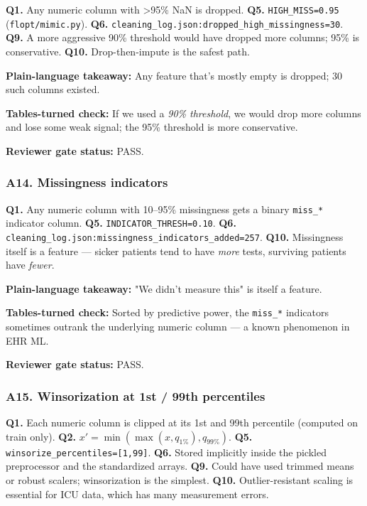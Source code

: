 \documentclass{article}
\begin{document}
\textbf{Q1.} Any numeric column with >95\% NaN is dropped. \textbf{Q5.} \texttt{HIGH\_MISS=0.95} (\texttt{flopt/mimic.py}). \textbf{Q6.} \texttt{cleaning\_log.json:dropped\_high\_missingness=30}. \textbf{Q9.} A more aggressive 90\% threshold would have dropped more columns; 95\% is conservative. \textbf{Q10.} Drop-then-impute is the safest path.


\textbf{Plain-language takeaway:} Any feature that's mostly empty is dropped; 30 such columns existed.


\textbf{Tables-turned check:} If we used a \emph{90\% threshold}, we would drop more columns and lose some weak signal; the 95\% threshold is more conservative.


\textbf{Reviewer gate status:} PASS.


\subsubsection{A14. Missingness indicators}


\textbf{Q1.} Any numeric column with 10--95\% missingness gets a binary \texttt{miss\_*} indicator column. \textbf{Q5.} \texttt{INDICATOR\_THRESH=0.10}. \textbf{Q6.} \texttt{cleaning\_log.json:missingness\_indicators\_added=257}. \textbf{Q10.} Missingness itself is a feature --- sicker patients tend to have \emph{more} tests, surviving patients have \emph{fewer}.


\textbf{Plain-language takeaway:} "We didn't measure this" is itself a feature.


\textbf{Tables-turned check:} Sorted by predictive power, the \texttt{miss\_*} indicators sometimes outrank the underlying numeric column --- a known phenomenon in EHR ML.


\textbf{Reviewer gate status:} PASS.


\subsubsection{A15. Winsorization at 1st / 99th percentiles}


\textbf{Q1.} Each numeric column is clipped at its 1st and 99th percentile (computed on train only). \textbf{Q2.} \(x' = \min(\max(x, q_{1\%}), q_{99\%})\). \textbf{Q5.} \texttt{winsorize\_percentiles=[1,99]}. \textbf{Q6.} Stored implicitly inside the pickled preprocessor and the standardized arrays. \textbf{Q9.} Could have used trimmed means or robust scalers; winsorization is the simplest. \textbf{Q10.} Outlier-resistant scaling is essential for ICU data, which has many measurement errors.
\end{document}
